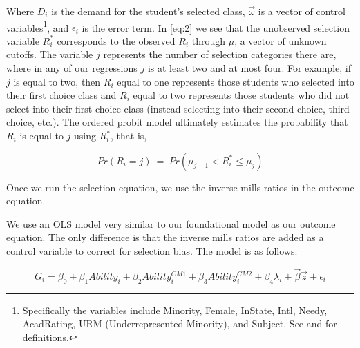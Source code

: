 Where $D_{i}$ is the demand for the student's selected class, $\overrightarrow{\omega}$ is a vector of control variables\footnote{Specifically the variables include Minority, Female, InState, Intl, Needy, AcadRating, URM (Underrepresented Minority), and Subject. See  and  for definitions.}, and $\epsilon_{i}$ is the error term. 
In \eqref{eq:2} we see that the unobserved selection variable $R_{i}^{*}$ corresponds to the observed $R_{i}$ through $\mu$, a vector of unknown cutoffs. 
The variable $j$ represents the number of selection categories there are, where in any of our regressions $j$ is at least two and at most four. 
For example, if $j$ is equal to two, then $R_{i}$ equal to one represents those students who selected into their first choice class and $R_{i}$ equal to two represents those students who did not select into their first choice class (instead selecting into their second choice, third choice, etc.). 
The ordered probit model ultimately estimates the probability that $R_{i}$ is equal to $j$ using $R_{i}^{*}$, that is, 

\setlength{\belowdisplayskip}{5pt} \setlength{\belowdisplayshortskip}{1pt}
\setlength{\abovedisplayskip}{-4pt} \setlength{\abovedisplayshortskip}{1pt}

\begin{equation}\label{eq:3}
Pr(R_{i} = j) \ = \ Pr(\mu_{j-1} < R_{i}^{*} \leq \mu_{j})
\end{equation}

\noindent Once we run the selection equation, we use the inverse mills ratios in the outcome equation.

We use an OLS model very similar to our foundational model as our outcome equation. 
The only difference is that the inverse mills ratios are added as a control variable to correct for selection bias. 
The model is as follows:

\begin{equation}\label{eq:4}
G_{i} = \beta_{0} + \beta_{1} Ability_{i} + \beta_{2} Ability_{i}^{CM1} + \beta_{3} Ability_{i}^{CM2} + \beta_{4} \lambda_{i} + \overrightarrow{\beta} \overrightarrow{z} + \epsilon_{i}
\end{equation}

